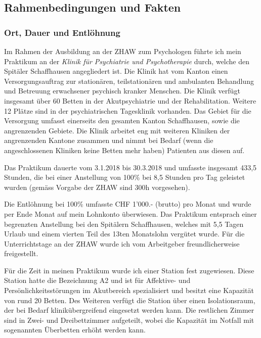 \subsection{Rahmenbedingungen und Fakten} \label{sec:Rahmenbedingungen}

\subsubsection{Ort, Dauer und Entlöhnung} 
Im Rahmen der Ausbildung an der ZHAW zum Psychologen führte ich mein Praktikum an der \textit{Klinik für Psychiatrie und Psychotherapie} durch, welche den Spitäler Schaffhausen angegliedert ist. Die Klinik hat vom Kanton einen Versorgungsauftrag zur stationären, teilstationären und ambulanten Behandlung und Betreuung erwachsener psychisch kranker Menschen. Die Klinik verfügt insgesamt über 60 Betten in der Akutpsychiatrie und der Rehabilitation. Weitere 12 Plätze sind in der psychiatrischen Tagesklinik vorhanden. Das Gebiet für die Versorgung umfasst einerseits den gesamten Kanton Schaffhausen, sowie die angrenzenden Gebiete. Die Klinik arbeitet eng mit weiteren Kliniken der angrenzenden Kantone zusammen und nimmt bei Bedarf (wenn die angeschlossenen Kliniken keine Betten mehr haben) Patienten aus diesen auf.

Das Praktikum dauerte vom 3.1.2018 bis 30.3.2018 und umfasste insgesamt 433,5 Stunden, die bei einer Anstellung von 100\% bei 8,5 Stunden pro Tag geleistet wurden (gemäss Vorgabe der ZHAW sind 300h vorgesehen). 

Die Entlöhnung bei 100\% umfasste CHF 1'000.- (brutto) pro Monat und wurde per Ende Monat auf mein Lohnkonto überwiesen. Das Praktikum entsprach einer begrenzten Anstellung bei den Spitälern Schaffhausen, welches mit 5,5 Tagen Urlaub und einem vierten Teil des 13ten Monatslohn vergütet wurde. Für die Unterrichtstage an der ZHAW wurde ich vom Arbeitgeber freundlicherweise freigestellt. 

Für die Zeit in meinen Praktikum wurde ich einer Station fest zugewiesen. Diese Station hatte die Bezeichnung A2 und ist für Affektive-  und Persönlichkeitsstörungen im Akutbereich spezialisiert und besitzt eine Kapazität von rund 20 Betten. Des Weiteren verfügt die Station über einen Isolationsraum, der bei Bedarf klinikübergreifend eingesetzt werden kann. Die restlichen Zimmer sind in Zwei- und Dreibettzimmer aufgeteilt, wobei die Kapazität im Notfall mit sogenannten Überbetten erhöht werden kann. 

